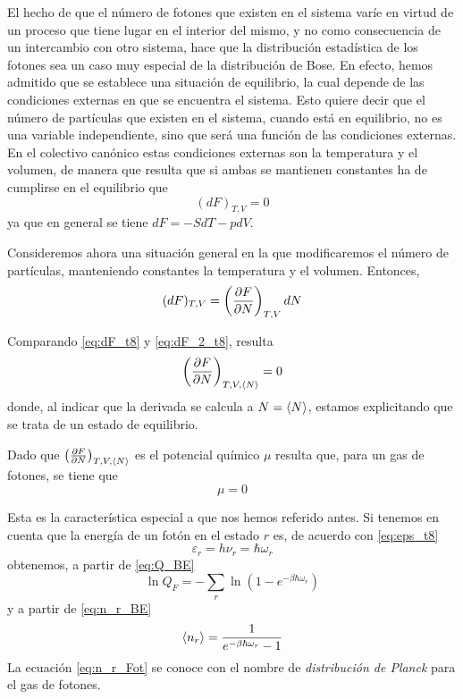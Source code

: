El hecho de que el número de fotones que existen en el sistema varíe en virtud de un proceso que tiene lugar en el interior del mismo, y no como consecuencia de un intercambio con otro sistema, hace que la distribución estadística de los fotones sea un caso muy especial de la distribución de Bose.
En efecto, hemos admitido que se establece una situación de equilibrio, la cual depende de las condiciones externas en que se encuentra el sistema.
Esto quiere decir que el número de partículas que existen en el sistema, cuando está en equilibrio, no es una variable independiente, sino que será una función de las condiciones externas.
En el colectivo canónico estas condiciones externas son la temperatura y el volumen, de manera que resulta que si ambas se mantienen constantes ha de cumplirse en el equilibrio que
\begin{equation}\label{eq:dF_t8}
	(dF)_{T,V} = 0
\end{equation}
ya que en general se tiene $dF = -SdT - pdV$.

Consideremos ahora una situación general en la que modificaremos el número de partículas, manteniendo constantes la temperatura y el volumen.
Entonces,
\begin{equation}\label{eq:dF_2_t8}
	(dF)_{T,V} = \left( \pdv{F}{N} \right)_{T,V} dN
\end{equation}

Comparando \eqref{eq:dF_t8} y \eqref{eq:dF_2_t8}, resulta
\begin{equation}
	\left( \pdv{F}{N} \right)_{T,V, \expval{N}} = 0
\end{equation}
donde, al indicar que la derivada se calcula a $N = \expval{N}$, estamos explicitando que se trata de un estado de equilibrio.

Dado que $\left( \pdv{F}{N} \right)_{T,V, \expval{N}}$ es el potencial químico $\mu$ resulta que, para un gas de fotones, se tiene que
\begin{equation}
	\mu = 0
\end{equation}

Esta es la característica especial a que nos hemos referido antes.
Si tenemos en cuenta que la energía de un fotón en el estado $r$ es, de acuerdo con \eqref{eq:eps_t8}
\begin{equation}
	\varepsilon_r = h\nu_r = \hbar\omega_r
\end{equation}
obtenemos, a partir de \eqref{eq:Q_BE}
\begin{equation}\label{eq:Q_Fot}
	\ln Q_F = -\sum_r \ln (1 - e^{-\beta\hbar\omega_r})
\end{equation}
y a partir de \eqref{eq:n_r_BE}
\begin{equation}\label{eq:n_r_Fot}
	\expval{n_r} = \frac{1}{e^{-\beta\hbar\omega_r} - 1}
\end{equation}
La ecuación \eqref{eq:n_r_Fot} se conoce con el nombre de \emph{distribución de Planck} para el gas de fotones.


